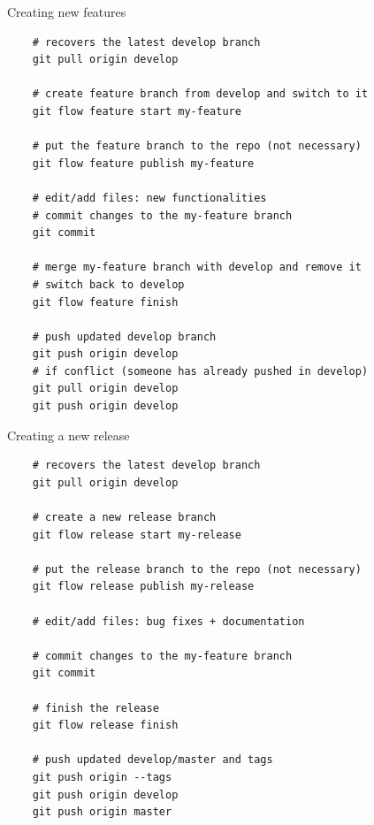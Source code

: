 \documentclass[svgnames]{beamer}
\begin{document}
\begin{frame}[fragile]{Creating new features}

    \vspace{-0.5em}

    \begin{lstlisting}
    # recovers the latest develop branch
    git pull origin develop

    # create feature branch from develop and switch to it
    git flow feature start my-feature 

    # put the feature branch to the repo (not necessary)
    git flow feature publish my-feature 

    # edit/add files: new functionalities
    # commit changes to the my-feature branch
    git commit 

    # merge my-feature branch with develop and remove it
    # switch back to develop
    git flow feature finish

    # push updated develop branch
    git push origin develop
    # if conflict (someone has already pushed in develop)
    git pull origin develop
    git push origin develop
    \end{lstlisting}

\end{frame}

\begin{frame}[fragile]{Creating a new release}

    \begin{lstlisting}
    # recovers the latest develop branch
    git pull origin develop

    # create a new release branch
    git flow release start my-release

    # put the release branch to the repo (not necessary)
    git flow release publish my-release 

    # edit/add files: bug fixes + documentation

    # commit changes to the my-feature branch
    git commit 

    # finish the release
    git flow release finish

    # push updated develop/master and tags
    git push origin --tags
    git push origin develop
    git push origin master
    \end{lstlisting}
\end{frame}
\end{document}
